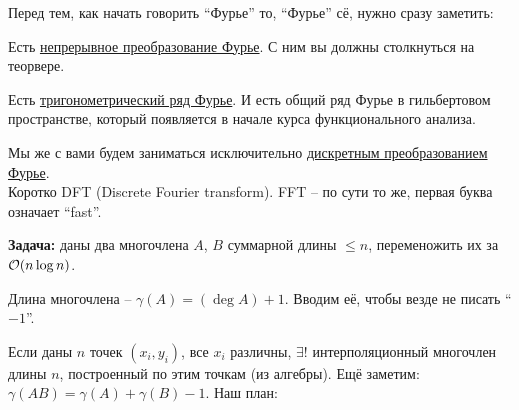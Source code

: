 
\down
Перед тем, как начать говорить ``Фурье'' то, ``Фурье'' сё, нужно сразу заметить:

Есть \href{https://ru.wikipedia.org/wiki/%D0%9F%D1%80%D0%B5%D0%BE%D0%B1%D1%80%D0%B0%D0%B7%D0%BE%D0%B2%D0%B0%D0%BD%D0%B8%D0%B5_%D0%A4%D1%83%D1%80%D1%8C%D0%B5}{непрерывное преобразование Фурье}. С ним вы должны столкнуться на теорвере.

Есть \href{https://ru.wikipedia.org/wiki/%D0%A0%D1%8F%D0%B4_%D0%A4%D1%83%D1%80%D1%8C%D0%B5}{тригонометрический ряд Фурье}.
И есть общий ряд Фурье в гильбертовом пространстве, который появляется в начале курса функционального анализа.

Мы же с вами будем заниматься исключительно \href{https://ru.wikipedia.org/wiki/%D0%94%D0%B8%D1%81%D0%BA%D1%80%D0%B5%D1%82%D0%BD%D0%BE%D0%B5_%D0%BF%D1%80%D0%B5%D0%BE%D0%B1%D1%80%D0%B0%D0%B7%D0%BE%D0%B2%D0%B0%D0%BD%D0%B8%D0%B5_%D0%A4%D1%83%D1%80%D1%8C%D0%B5}{дискретным преобразованием Фурье}. \\
Коротко DFT (Discrete Fourier transform). FFT -- по сути то же, первая буква означает ``fast''.

\down
{\bf Задача:} даны два многочлена $A$, $B$ суммарной длины $\le n$, переменожить их за $\mathcal{O}(n \log n)$.

\down
Длина многочлена -- $\gamma(A) = (\deg A) + 1$. Вводим её, чтобы везде не писать ``${-}1$''.

Если даны $n$ точек $(x_i, y_i)$, все $x_i$ различны, $\exists !$
интерполяционный многочлен длины $n$, построенный по этим точкам (из алгебры).
Ещё заметим: $\gamma(AB) = \gamma(A) + \gamma(B) - 1$. Наш план: 

